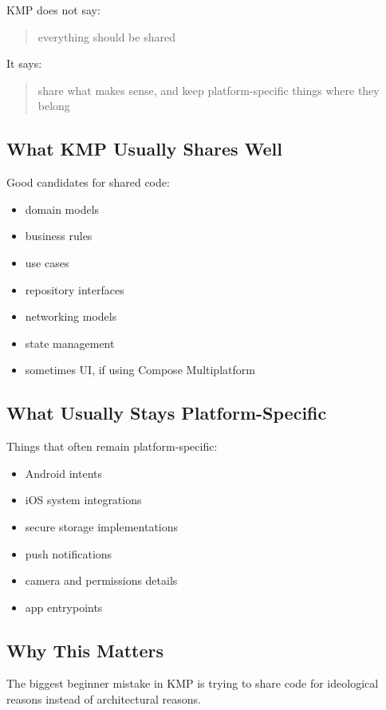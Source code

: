 \documentclass[11pt,a4paper]{article}
\begin{document}
KMP does not say:
\begin{quote}
everything should be shared
\end{quote}

It says:
\begin{quote}
share what makes sense, and keep platform-specific things where they belong
\end{quote}

\subsection{What KMP Usually Shares Well}

Good candidates for shared code:
\begin{itemize}
    \item domain models
    \item business rules
    \item use cases
    \item repository interfaces
    \item networking models
    \item state management
    \item sometimes UI, if using Compose Multiplatform
\end{itemize}

\subsection{What Usually Stays Platform-Specific}

Things that often remain platform-specific:
\begin{itemize}
    \item Android intents
    \item iOS system integrations
    \item secure storage implementations
    \item push notifications
    \item camera and permissions details
    \item app entrypoints
\end{itemize}

\subsection{Why This Matters}

The biggest beginner mistake in KMP is trying to share code for ideological reasons instead of architectural reasons.
\end{document}
